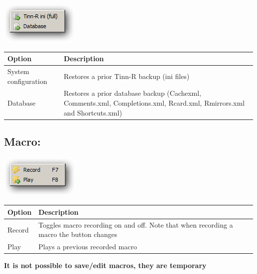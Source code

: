 \includegraphics[scale=0.50]{./res/menu_tools_restore.png}\\

\begin{scriptsize}\begin{tabularx}{\textwidth}{>{\hsize=0.3\hsize}X>{\hsize=0.7\hsize}X}\\
    \hline
    \textbf{Option} & \textbf{Description} \\
    \hline
    System configuration & Restores a prior Tinn-R backup (ini files) \\
    Database & Restores a prior database backup (Cachexml, Comments.xml, Completions.xml, Rcard.xml, Rmirrors.xml and Shortcuts.xml) \\
    \hline
  \end{tabularx}\end{scriptsize}


\hypertarget{menu_tools_macro}{}
\subsection{Macro:}

\includegraphics[scale=0.50]{./res/menu_tools_macro.png}\\

\begin{scriptsize}\begin{tabularx}{\textwidth}{>{\hsize=0.3\hsize}X>{\hsize=0.7\hsize}X}\\
    \hline
    \textbf{Option} & \textbf{Description} \\
    \hline
    Record & Toggles macro recording on and off. Note that when recording a macro the button changes \\
    Play & Plays a previous recorded macro \\
    \hline
  \end{tabularx}\end{scriptsize}

\textbf{It is not possible to save/edit macros, they are temporary}


